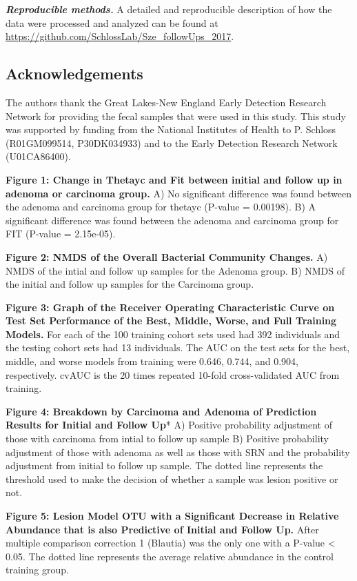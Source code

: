 \documentclass[12pt,]{article}
\begin{document}
\textbf{\emph{Reproducible methods.}} A detailed and reproducible
description of how the data were processed and analyzed can be found at
\url{https://github.com/SchlossLab/Sze_followUps_2017}.

\newpage

\subsection{Acknowledgements}\label{acknowledgements}

The authors thank the Great Lakes-New England Early Detection Research
Network for providing the fecal samples that were used in this study.
This study was supported by funding from the National Institutes of
Health to P. Schloss (R01GM099514, P30DK034933) and to the Early
Detection Research Network (U01CA86400).

\newpage

\textbf{Figure 1: Change in Thetayc and Fit between initial and follow
up in adenoma or carcinoma group.} A) No significant difference was
found between the adenoma and carcinoma group for thetayc (P-value =
0.00198). B) A significant difference was found between the adenoma and
carcinoma group for FIT (P-value = 2.15e-05).

\textbf{Figure 2: NMDS of the Overall Bacterial Community Changes.} A)
NMDS of the intial and follow up samples for the Adenoma group. B) NMDS
of the initial and follow up samples for the Carcinoma group.

\textbf{Figure 3: Graph of the Receiver Operating Characteristic Curve
on Test Set Performance of the Best, Middle, Worse, and Full Training
Models.} For each of the 100 training cohort sets used had 392
individuals and the testing cohort sets had 13 individuals. The AUC on
the test sets for the best, middle, and worse models from training were
0.646, 0.744, and 0.904, respectively. cvAUC is the 20 times repeated
10-fold cross-validated AUC from training.

\textbf{Figure 4: Breakdown by Carcinoma and Adenoma of Prediction
Results for Initial and Follow Up}* A) Positive probability adjustment
of those with carcinoma from intial to follow up sample B) Positive
probability adjustment of those with adenoma as well as those with SRN
and the probability adjustment from initial to follow up sample. The
dotted line represents the threshold used to make the decision of
whether a sample was lesion positive or not.

\textbf{Figure 5: Lesion Model OTU with a Significant Decrease in
Relative Abundance that is also Predictive of Initial and Follow Up.}
After multiple comparison correction 1 (Blautia) was the only one with a
P-value \textless{} 0.05. The dotted line represents the average
relative abundance in the control training group.
\end{document}
